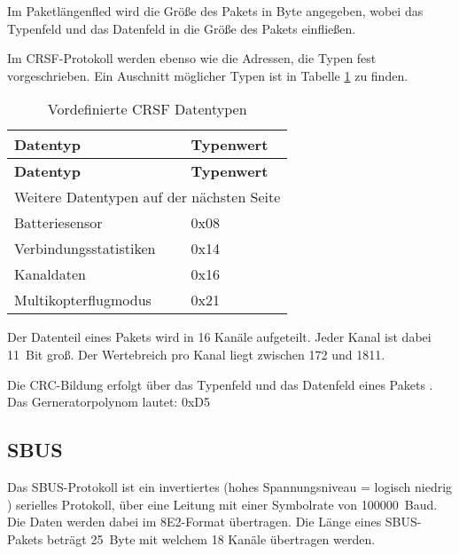 Im Paketlängenfled wird die Größe des Pakets in Byte angegeben, wobei das Typenfeld und das Datenfeld in die Größe des Pakets einfließen. \cite{cleanflightCrsf}

Im CRSF-Protokoll werden ebenso wie die Adressen, die Typen fest vorgeschrieben. Ein Auschnitt möglicher Typen ist in Tabelle \ref{table:crsfTyp} zu finden.

\begin{longtable}[c]{|l|l|}
    \caption{Vordefinierte CRSF Datentypen \cite{cleanflightCrsfP}}
    \label{table:crsfTyp}\\
    \hline
    \textbf{Datentyp} & \textbf{Typenwert}\\
    \hline
    \hline
    \endfirsthead

    \hline
    \textbf{Datentyp} & \textbf{Typenwert}\\
    \hline
    \hline
    \endhead

    \hline
    \multicolumn{2}{|r|}{Weitere Datentypen auf der nächsten Seite}\\
    \hline
    \endfoot

    \hline
    \endlastfoot
    
    Batteriesensor & 0x08 \\
    \hline
    Verbindungsstatistiken & 0x14 \\
    \hline
    Kanaldaten & 0x16 \\
    \hline
    Multikopterflugmodus & 0x21 \\
\end{longtable}

Der Datenteil eines Pakets wird in 16 Kanäle aufgeteilt. Jeder Kanal ist dabei 11~Bit groß. Der Wertebreich pro Kanal liegt zwischen 172 und 1811. \cite{cleanflightCrsf}

Die CRC-Bildung erfolgt über das Typenfeld und das Datenfeld eines Pakets \cite{cleanflightCrsf}. Das Gerneratorpolynom lautet: 0xD5 \cite{cleanflightCRC}

\subsection{SBUS}

Das SBUS-Protokoll ist ein invertiertes (hohes Spannungsniveau = logisch niedrig \cite{sigrokSBus}) serielles Protokoll, über eine Leitung mit einer Symbolrate von 100000~Baud. Die Daten werden dabei im 8E2-Format übertragen. Die Länge eines SBUS-Pakets beträgt 25~Byte mit welchem 18 Kanäle übertragen werden. \cite{BolderFlight}

